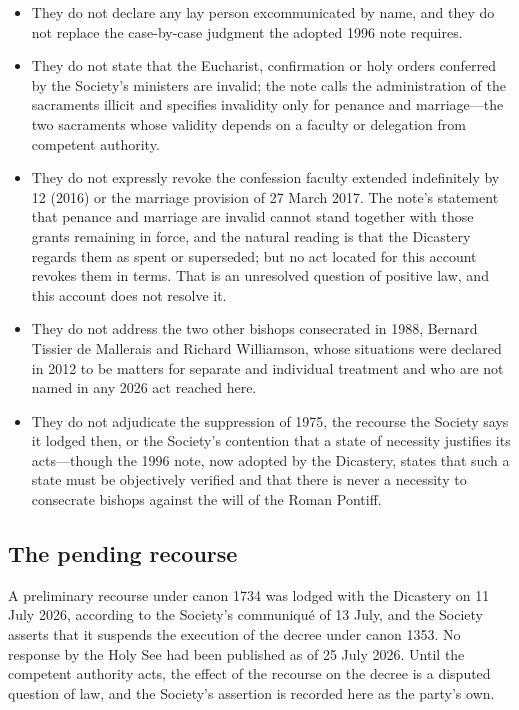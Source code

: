 \begin{itemize}
\item They do not declare any lay person excommunicated by name, and they
do not replace the case-by-case judgment the adopted 1996 note requires.
\item They do not state that the Eucharist, confirmation or holy orders
conferred by the Society's ministers are invalid; the note calls the
administration of the sacraments illicit and specifies invalidity only
for penance and marriage---the two sacraments whose validity depends on a
faculty or delegation from competent authority.
\item They do not expressly revoke the confession faculty extended
indefinitely by  12 (2016) or the marriage
provision of 27 March 2017. The note's statement that penance and
marriage are invalid cannot stand together with those grants remaining in
force, and the natural reading is that the Dicastery regards them as
spent or superseded; but no act located for this account revokes them in
terms. That is an unresolved question of positive law, and this account
does not resolve it.
\item They do not address the two other bishops consecrated in 1988,
Bernard Tissier de Mallerais and Richard Williamson, whose situations
were declared in 2012 to be matters for separate and individual
treatment and who are not named in any 2026 act reached here.
\item They do not adjudicate the suppression of 1975, the recourse the
Society says it lodged then, or the Society's contention that a state of
necessity justifies its acts---though the 1996 note, now adopted by the
Dicastery, states that such a state must be objectively verified and that
there is never a necessity to consecrate bishops against the will of the
Roman Pontiff.
\end{itemize}

\subsection{The pending recourse}

A preliminary recourse under canon 1734 was lodged with the Dicastery on
11 July 2026, according to the Society's communiqué of 13 July, and the
Society asserts that it suspends the execution of the decree under canon
1353. No response by the Holy See had been published as of 25 July 2026.
Until the competent authority acts, the effect of the recourse on the
decree is a disputed question of law, and the Society's assertion is
recorded here as the party's own.

